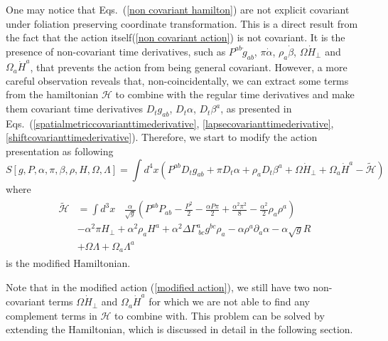 One may notice that Eqs.~(\ref{non covariant hamilton}) are not explicit covariant under foliation preserving coordinate transformation. This is a direct result from the fact that the action itself(\ref{non covariant action}) is not covariant. It is the presence of non-covariant time derivatives, such as $P^{ab}{\dot g}_{ab}$, $\pi{\dot \alpha}$, $\rho_{a}{\dot \beta}$, $\Omega{\dot H}_{\perp}$ and $\Omega_{a}{\dot H}^{a}$, that prevents the action from being general covariant. However, a more careful observation reveals that, non-coincidentally, we can extract some terms from the hamiltonian $\mathscr{H}$ to combine with the regular time derivatives and make them covariant time derivatives $D_{t}g_{ab}$, $D_{t}\alpha$, $D_{t}\beta^{a}$, as presented in Eqs.~(\ref{spatialmetriccovarianttimederivative}, \ref{lapsecovarianttimederivative}, \ref{shiftcovarianttimederivative}). Therefore, we start to modify the action presentation as following
\begin{equation}\label{modified action}
S[g, P, \alpha, \pi, \beta, \rho, H, \Omega, \Lambda ] = \int d^{4}x \left( P^{ab}D_{t}g_{ab} + \pi D_{t}\alpha + \rho_{a}D_{t}\beta^{a} + \Omega {\dot H}_{\perp} + \Omega_{a}{\dot H}^{a} - \tilde{\mathscr{H}}\right)
\end{equation}
where
\begin{align}
\begin{split}
\tilde{\mathscr{H}} & = \int d^{3}x~~~~\frac{\alpha}{\sqrt{g}}\left(P^{ab}P_{ab} - \frac{P^{2}}{2} - \frac{\alpha P \pi}{2} + \frac{\alpha^{2}\pi^{2}}{8} - \frac{\alpha^{2}}{2}\rho_{a}\rho^{a}\right)\\
& -\alpha^{2}\pi H_{\perp} + \alpha^{2}\rho_{a}H^{a} + \alpha^{2}\Delta\Gamma^{a}_{~bc}g^{bc}\rho_{a} - \alpha \rho^{a}\partial_{a}\alpha - \alpha\sqrt{g}R\\
& + \Omega \Lambda + \Omega_{a}\Lambda^{a}
\end{split}
\end{align}
is the modified Hamiltonian. 

Note that in the modified action (\ref{modified action}), we still have two non-covariant terms $\Omega {\dot H}_{\perp}$ and $\Omega_{a}{\dot H}^{a}$ for which we are not able to find any complement terms in $\mathscr{H}$ to combine with. This problem can be solved by extending the Hamiltonian, which is discussed in detail in the following section. 

